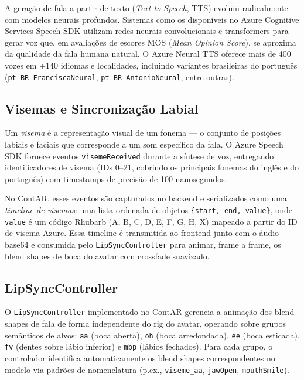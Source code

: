 \documentclass[
  12pt,
  openright,
  twoside,
  a4paper,
  english,
  brazil
]{abntex2}
\begin{document}
A geração de fala a partir de texto (\textit{Text-to-Speech}, TTS) evoluiu
radicalmente com modelos neurais profundos. Sistemas como os disponíveis
no Azure Cognitive Services Speech SDK \cite{azurespeech} utilizam redes
neurais convolucionais e transformers para gerar voz que, em avaliações
de escores MOS (\textit{Mean Opinion Score}), se aproxima da qualidade da
fala humana natural. O Azure Neural TTS oferece mais de 400 vozes em
+140 idiomas e localidades, incluindo variantes brasileiras do português
(\texttt{pt-BR-FranciscaNeural}, \texttt{pt-BR-AntonioNeural}, entre outras).

\subsection{Visemas e Sincronização Labial}
\label{subsec:visemas}

Um \textit{visema} é a representação visual de um fonema — o conjunto de
posições labiais e faciais que corresponde a um som específico da fala.
O Azure Speech SDK fornece eventos \texttt{visemeReceived} durante a
síntese de voz, entregando identificadores de visema (IDs 0--21, cobrindo
os principais fonemas do inglês e do português) com timestamps de precisão
de 100 nanosegundos.

No ContAR, esses eventos são capturados no backend e serializados como
uma \textit{timeline de visemas}: uma lista ordenada de objetos
\texttt{\{start, end, value\}}, onde \texttt{value} é um código Rhubarb
(A, B, C, D, E, F, G, H, X) mapeado a partir do ID de visema Azure.
Essa timeline é transmitida ao frontend junto com o áudio base64 e
consumida pelo \texttt{LipSyncController} para animar, frame a frame,
os blend shapes de boca do avatar com crossfade suavizado.

\subsection{LipSyncController}
\label{subsec:lipsync-controller}

O \texttt{LipSyncController} implementado no ContAR gerencia a animação
dos blend shapes de fala de forma independente do rig do avatar, operando
sobre grupos semânticos de alvos: \texttt{aa} (boca aberta), \texttt{oh}
(boca arredondada), \texttt{ee} (boca esticada), \texttt{fv} (dentes sobre
lábio inferior) e \texttt{mbp} (lábios fechados). Para cada grupo, o
controlador identifica automaticamente os blend shapes correspondentes no
modelo via padrões de nomenclatura (p.ex., \texttt{viseme\_aa},
\texttt{jawOpen}, \texttt{mouthSmile}).
\end{document}
